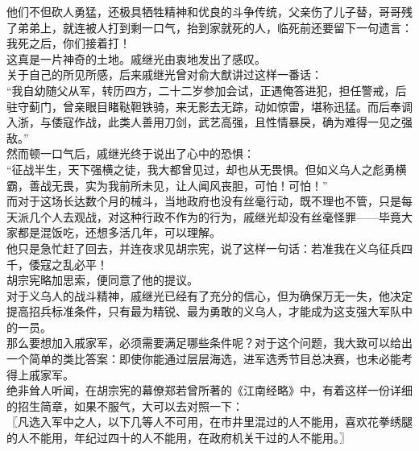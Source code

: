 \begin{multicols}{\theparacolNo}
他们不但砍人勇猛，还极具牺牲精神和优良的斗争传统，父亲伤了儿子替，哥哥残了弟弟上，就连被人打到剩一口气，抬到家就死的人，临死前还要留下一句遗言：我死之后，你们接着打！\\

这真是一片神奇的土地。戚继光由衷地发出了感叹。\\

关于自己的所见所感，后来戚继光曾对俞大猷讲过这样一番话：\\

“我自幼随父从军，转历四方，二十二岁参加会试，正遇俺答进犯，担任警戒，后驻守蓟门，曾亲眼目睹鞑靼铁骑，来无影去无踪，动如惊雷，堪称迅猛。而后奉调入浙，与倭寇作战，此类人善用刀剑，武艺高强，且性情暴戾，确为难得一见之强敌。”\\

然而顿一口气后，戚继光终于说出了心中的恐惧：\\

“征战半生，天下强横之徒，我大都曾见过，却也从无畏惧。但如义乌人之彪勇横霸，善战无畏，实为我前所未见，让人闻风丧胆，可怕！可怕！”\\

而对于这场长达数个月的械斗，当地政府也没有丝毫行动，既不理也不管，只是每天派几个人去观战，对这种行政不作为的行为，戚继光却没有丝毫怪罪——毕竟大家都是混饭吃，还想多活几年，可以理解。\\

他只是急忙赶了回去，并连夜求见胡宗宪，说了这样一句话：若准我在义乌征兵四千，倭寇之乱必平！\\

胡宗宪略加思索，便同意了他的提议。\\

对于义乌人的战斗精神，戚继光已经有了充分的信心，但为确保万无一失，他决定提高招兵标准条件，只有最为精锐、最为勇敢的义乌人，才能成为这支强大军队中的一员。\\

那么要想加入戚家军，必须需要满足哪些条件呢？对于这个问题，我大致可以给出一个简单的类比答案：即使你能通过层层海选，进军选秀节目总决赛，也未必能考得上戚家军。\\

绝非耸人听闻，在胡宗宪的幕僚郑若曾所著的《江南经略》中，有着这样一份详细的招生简章，如果不服气，大可以去对照一下：\\

〖凡选入军中之人，以下几等人不可用，在市井里混过的人不能用，喜欢花拳绣腿的人不能用，年纪过四十的人不能用，在政府机关干过的人不能用。〗\\


\end{multicols}
